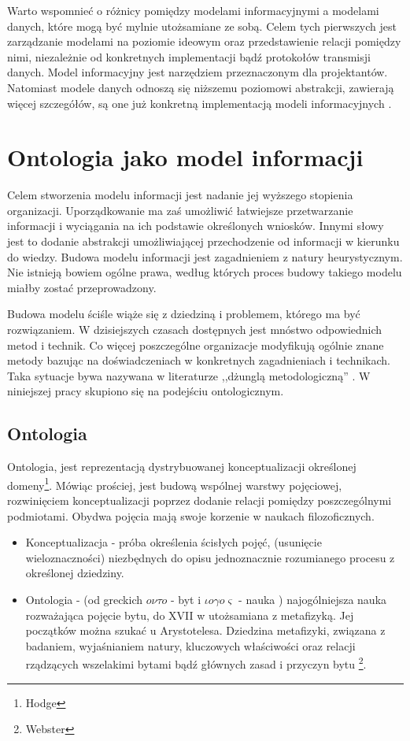 \documentclass[12pt,a4paper,notitlepage]{article}
\begin{document}
Warto wspomnieć o różnicy pomiędzy modelami informacyjnymi a modelami danych,
które mogą być mylnie utożsamiane ze sobą. Celem tych pierwszych jest 
zarządzanie modelami na poziomie ideowym oraz przedstawienie relacji pomiędzy
nimi, niezależnie od konkretnych implementacji bądź protokołów transmisji
danych. Model informacyjny jest narzędziem przeznaczonym dla projektantów.
Natomiast modele danych odnoszą się niższemu poziomowi abstrakcji, zawierają
więcej szczegółów, są one już konkretną implementacją modeli informacyjnych 
\cite{RFC3444}.



\section{Ontologia jako model informacji}
Celem stworzenia modelu informacji jest nadanie jej wyższego stopienia organizacji. Uporządkowanie ma zaś umożliwić łatwiejsze przetwarzanie informacji i wyciągania na ich podstawie określonych wniosków. Innymi słowy jest to dodanie abstrakcji umożliwiającej przechodzenie od informacji w kierunku do wiedzy. Budowa modelu informacji jest zagadnieniem z natury heurystycznym. Nie istnieją bowiem ogólne prawa, według których proces budowy takiego modelu miałby zostać przeprowadzony. 

Budowa modelu ściśle wiąże się z dziedziną i problemem, którego ma być rozwiązaniem. W dzisiejszych czasach dostępnych jest mnóstwo odpowiednich metod i technik. Co więcej poszczególne organizacje modyfikują ogólnie znane metody bazując na doświadczeniach w konkretnych zagadnieniach i technikach. Taka sytuacje bywa nazywana w literaturze ,,dżunglą metodologiczną'' \cite{Verhoef}. W niniejszej pracy skupiono się na podejściu ontologicznym.

\subsection{Ontologia}
Ontologia, jest reprezentacją dystrybuowanej konceptualizacji określonej domeny\footnote{Hodge}. Mówiąc prościej, jest budową wspólnej warstwy pojęciowej, rozwinięciem konceptualizacji poprzez dodanie relacji pomiędzy poszczególnymi podmiotami. Obydwa pojęcia mają swoje korzenie w naukach filozoficznych.
\begin{itemize}
   \item Konceptualizacja - próba określenia ścisłych pojęć, (usunięcie wieloznaczności) niezbędnych do opisu jednoznacznie rozumianego procesu z określonej dziedziny.
	\item Ontologia - (od greckich $o \nu \tau o$ - byt i $\iota o\gamma o\varsigma$ - nauka ) najogólniejsza nauka rozważająca pojęcie bytu, do XVII w utożsamiana z metafizyką. Jej początków można szukać u Arystotelesa. Dziedzina metafizyki, związana z badaniem, wyjaśnianiem natury, kluczowych właściwości oraz relacji rządzących wszelakimi bytami bądź głównych zasad i przyczyn bytu \footnote{Webster}.
\end{itemize}  
\end{document}
